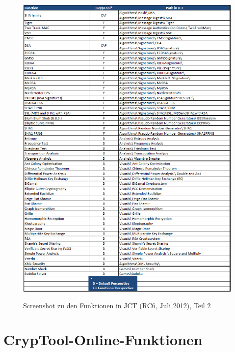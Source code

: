 \clearpage
\begin{figure}[hb]
\begin{center}
\includegraphics[scale=0.8, angle=0] {figures/JCT-functions-de-2}
\hypertarget{functions-overview-2-JCT}{}
\caption{Screenshot zu den Funktionen in JCT (RC6, Juli 2012), Teil 2}
\label{functions-overview-2-JCT}
\end{center}
\end{figure}
\clearpage





\hypertarget{appendix-function-overview-CTO}{}
\section{CrypTool-Online-Funktionen}
\label{s:appendix-function-overview-CTO}

